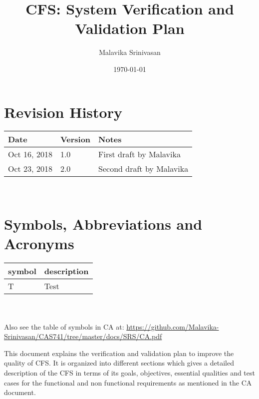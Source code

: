 \documentclass[12pt, titlepage]{article}
\newcommand{\famname}{CFS} %
\begin{document}
\title{CFS: System Verification and Validation Plan} 
\author{Malavika Srinivasan}
\date{\today}
	
\maketitle



\section{Revision History}

\begin{tabularx}{\textwidth}{p{3cm}p{2cm}X}
\toprule {\bf Date} & {\bf Version} & {\bf Notes}\\
\midrule
Oct 16, 2018 & 1.0 & First draft by Malavika\\
Oct 23, 2018 & 2.0 & Second draft by Malavika\\

\bottomrule
\end{tabularx}

~\newpage

\section{Symbols, Abbreviations and Acronyms}

\renewcommand{\arraystretch}{1.2}
\begin{tabular}{l l} 
  \toprule		
  \textbf{symbol} & \textbf{description}\\
  \midrule 
  T & Test\\
  \bottomrule
\end{tabular}\\
\\
Also see the table of symbols in CA at: \url{https://github.com/Malavika-Srinivasan/CAS741/tree/master/docs/SRS/CA.pdf}\\


\newpage

\tableofcontents

\listoftables

\listoffigures

\newpage



This document explains the verification and validation plan to improve the quality of \famname{}. It is organized into different sections which gives a detailed description of the \famname{} in terms of its goals, objectives, essential qualities and test cases for the functional and non functional requirements as mentioned in the CA document.
\end{document}
